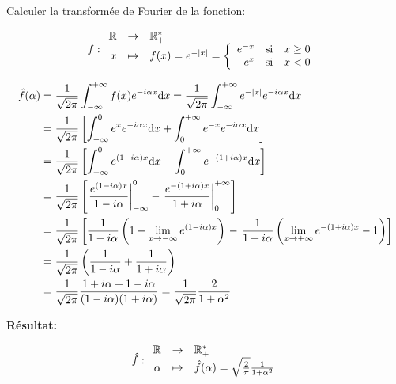 \begin{example}
    Calculer la transformée de Fourier de la fonction:
    
    \[
    f:
    \begin{array}{r c l}
        \mathbb{R} & \rightarrow & \mathbb{R}_+^* \\
        x  & \mapsto & f(x) = e^{-|x|} =
        \left \{
        \begin{array}{r c l}
            e^{-x} & \textrm{si} & x \geq 0 \\
            e^x    & \textrm{si} & x < 0
        \end{array}
        \right.
    \end{array}
    \]
    
    \begin{align*}
    \hat{f}(\alpha) & =
    \frac{1}{\sqrt{2 \pi}}
    \int_{-\infty}^{+\infty}
    f(x)
    e^{-i \alpha x}
    \mathrm{d}x
    =
    \frac{1}{\sqrt{2 \pi}}
    \int_{-\infty}^{+\infty}
    e^{-|x|}
    e^{-i \alpha x}
    \mathrm{d}x
    \\&=
    \frac{1}{\sqrt{2 \pi}}
    \left[
    \int_{-\infty}^{0}
    e^{x}
    e^{-i \alpha x}
    \mathrm{d}x
    +
    \int_{0}^{+\infty}
    e^{-x}
    e^{-i \alpha x}
    \mathrm{d}x
    \right]
    \\&=
    \frac{1}{\sqrt{2 \pi}}
    \left[
    \int_{-\infty}^{0}
    e^{(1 - i \alpha) x}
    \mathrm{d}x
    +
    \int_{0}^{+\infty}
    e^{-(1 + i \alpha) x}
    \mathrm{d}x
    \right]
    \\&=
    \frac{1}{\sqrt{2 \pi}}
    \left[
    \left.
    \frac{e^{(1 - i \alpha) x}}
    {1 - i \alpha}
    \right|_{-\infty}^0
    -
    \left.
    \frac{e^{-(1 + i \alpha) x}}
    {1 + i \alpha}
    \right|_0^{+\infty}
    \right]
    \\&=
    \frac{1}{\sqrt{2 \pi}}
    \left[
    \frac{1}
    {1 - i \alpha}
    \left(
    1 - \lim\limits_{x \rightarrow -\infty} e^{(1 - i \alpha) x}
    \right)
    \right.
    -
    \left.
    \frac{1}
    {1 + i \alpha}
    \left(
    \lim\limits_{x \rightarrow + \infty} e^{-(1 + i \alpha) x} - 1
    \right)
    \right]
    \\&=
    \frac{1}{\sqrt{2 \pi}}
    \left(
    \frac{1}{1 - i \alpha}
    +
    \frac{1}{1 + i \alpha}
    \right)
    \\&=
    \frac{1}{\sqrt{2 \pi}}
    \frac{1 + i \alpha + 1 - i \alpha}
    {(1 - i \alpha) (1 + i \alpha)}
    =
    \frac{1}{\sqrt{2 \pi}}
    \frac{2}{1 + \alpha^2}
    \end{align*}
    
    \textbf{Résultat:}
    
    \[
    \hat{f}:
    \begin{array}{r c l}
    \mathbb{R} & \rightarrow & \mathbb{R}_+^* \\
    \alpha & \mapsto & \hat{f}(\alpha) =
    \sqrt{\frac{2}{\pi}} \frac{1}{1 + \alpha^2}
    \end{array}
    \]
\end{example}


